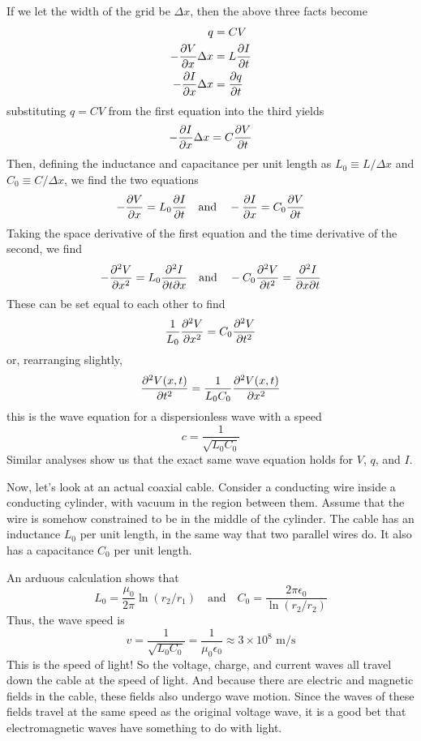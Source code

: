 If we let the width of the grid be $\Delta x$, then the above three facts become
\begin{align*}
    q &= CV \\
    -\pdv{V}{x}\Delta x &= L\pdv{I}{t} \\
    -\pdv{I}{x}\Delta x &= \pdv{q}{t}
\end{align*}
substituting $q=CV$ from the first equation into the third yields
\[ -\pdv{I}{x}\Delta x = C\pdv{V}{t} \]
Then, defining the inductance and capacitance per unit length as $L_0 \equiv L/\Delta x$ and $C_0 \equiv C/\Delta x$, we find the two equations
\[ -\pdv{V}{x} = L_0\pdv{I}{t} \quad\text{and}\quad -\pdv{I}{x} = C_0\pdv{V}{t} \]
Taking the space derivative of the first equation and the time derivative of the second, we find
\[ -\pdv[2]{V}{x} = L_0\frac{\partial ^2I}{\partial t\partial x}\quad\text{and}\quad -C_0\pdv[2]{V}{t} = \frac{\partial^2 I}{\partial x \partial t}\]
These can be set equal to each other to find
\[ \frac{1}{L_0}\pdv[2]{V}{x} = C_0\pdv[2]{V}{t}\]
or, rearranging slightly,
\[ \pdv[2]{V(x,t)}{t} = \frac{1}{L_0C_0}\pdv[2]{V(x,t)}{x} \]
this is the wave equation for a dispersionless wave with a speed
\[ c = \frac{1}{\sqrt{L_0C_0}}\]
Similar analyses show us that the exact same wave equation holds for $V$, $q$, and $I$.

Now, let's look at an actual coaxial cable. Consider a conducting wire inside a conducting cylinder, with vacuum in the region between them. Assume that the wire is somehow constrained to be in the middle of the cylinder. The cable has an inductance $L_0$ per unit length, in the same way that two parallel wires do. It also has a capacitance $C_0$ per unit length.

An arduous calculation shows that
\[ L_0 = \frac{\mu_0}{2\pi} \ln(r_2/r_1) \quad\text{and}\quad C_0 = \frac{2\pi\epsilon_0}{\ln(r_2/r_2)} \]
Thus, the wave speed is 
\[ v = \frac{1}{\sqrt{L_0C_0}} = \frac{1}{\mu_0\epsilon_0} \approx 3\times 10^8 \text{ m/s}\]
This is the speed of light! So the voltage, charge, and current waves all travel down the cable at the speed of light. And because there are electric and magnetic fields in the cable, these fields also undergo wave motion. Since the waves of these fields travel at the same speed as the original voltage wave, it is a good bet that electromagnetic waves have something to do with light. 

